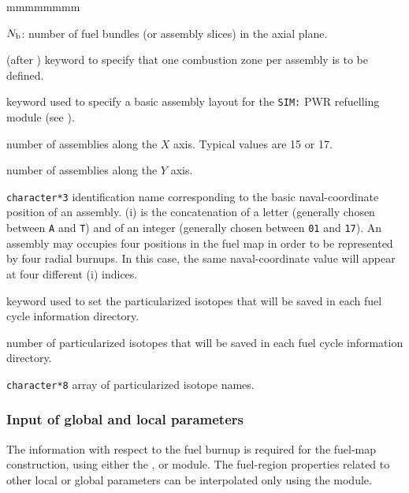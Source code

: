 \begin{ListeDeDescription}{mmmmmmmm}
\item[\dusa{nb}] $N_{\rm b}$: number of fuel bundles (or assembly slices) in the axial plane.

\item[\moc{ASBLY}] (after ) keyword to specify that one combustion zone per assembly is to be defined.

\item[\moc{SIM}] keyword used to specify a basic assembly layout for the {\tt SIM:} PWR refuelling module (see ).

\item[\dusa{lx}] number of assemblies along the $X$ axis. Typical values are 15 or 17.

\item[\dusa{ly}] number of assemblies along the $Y$ axis.

\item[\dusa{naval}] \texttt{character*3} identification name corresponding to the basic naval-coordinate position of an assembly. (i) is the
concatenation of a letter (generally chosen between {\tt A} and {\tt T}) and of an integer (generally chosen between {\tt 01}
and {\tt 17}). An assembly may occupies four positions in the fuel map in order to be represented by four radial burnups. In
this case, the same naval-coordinate value will appear at four different (i) indices.

\item[\moc{FOLLOW}] keyword used to set the particularized isotopes that will be saved in each fuel cycle information directory.

\item[\dusa{nis}] number of particularized isotopes that will be saved in each fuel cycle information directory.

\item[\dusa{HISOT}] \texttt{character*8} array of particularized isotope names.

\end{ListeDeDescription}

\vskip 0.2cm
\subsubsection{Input of global and local parameters}\label{sect:resiniaram}

\noindent
The information with respect to the fuel burnup is required for the fuel-map 
construction, using either the ,  or  module. The fuel-region properties
related to other local or global parameters can be interpolated only using the  module.

